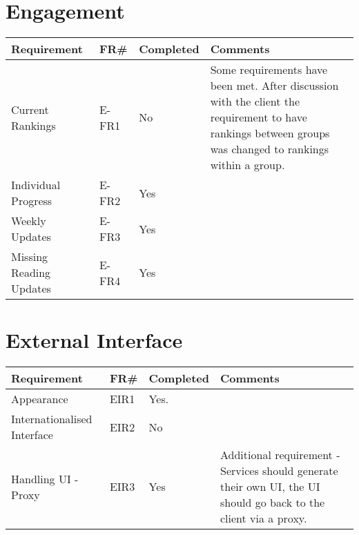 \section{Engagement}
\begin{tabular}{ |p{5cm}|l|l|p{8cm}|}
\hline
\textbf{Requirement}	&	\textbf{FR\#}	&	\textbf{Completed}	&	\textbf{Comments} \\
\hline
Current Rankings 									& E-FR1		& No	& Some requirements have been met. After discussion with the client the requirement to have rankings between groups was changed to rankings within a group.  \\
\hline
Individual Progress									& E-FR2		& Yes	&  \\
\hline
Weekly Updates 										& E-FR3		& Yes	&  \\
\hline
Missing Reading Updates 							& E-FR4		& Yes	&  \\

\hline
\end{tabular}


\section{External Interface}
\begin{tabular}{ |p{5cm}|l|l|p{8cm}|}
\hline
\textbf{Requirement}	&	\textbf{FR\#}	&	\textbf{Completed}	&	\textbf{Comments} \\
\hline
Appearance & EIR1 & Yes. &  \\
\hline
Internationalised Interface & EIR2 & No &  \\
\hline
Handling UI - Proxy & EIR3 & Yes & Additional requirement - Services should generate their own UI, the UI should go back to the client via a proxy. \\
\hline
\end{tabular}
